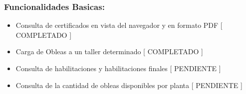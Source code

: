 \documentclass[11pt]{article}
\begin{document}
\subsubsection{Funcionalidades Basicas:}
\label{sec:org8100173}

\begin{itemize}
\item Consulta de certificados en vista del navegador y en formato PDF [ COMPLETADO ]
\item Carga de Obleas a un taller determinado [ COMPLETADO ]
\item Consulta de habilitaciones y habilitaciones finales [ PENDIENTE ]
\item Consulta de la cantidad de obleas disponibles por planta [ PENDIENTE ]
\end{itemize}
\end{document}
